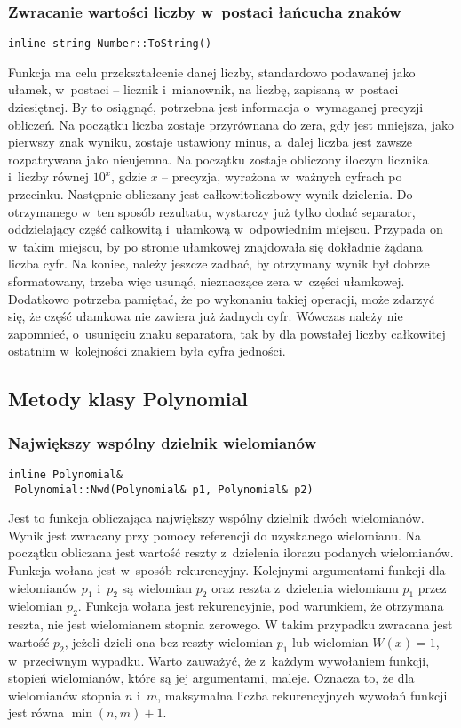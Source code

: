 \subsubsection{Zwracanie wartości liczby w~postaci łańcucha znaków}
\begin{lstlisting}
inline string Number::ToString()
\end{lstlisting}

Funkcja ma celu przekształcenie danej liczby, standardowo podawanej jako ułamek, w~postaci -- licznik i~mianownik, na liczbę, zapisaną w~postaci dziesiętnej. By to osiągnąć, potrzebna jest informacja o~wymaganej precyzji obliczeń. Na początku liczba zostaje przyrównana do zera, gdy jest mniejsza, jako pierwszy znak wyniku, zostaje ustawiony minus, a~dalej liczba jest zawsze rozpatrywana jako nieujemna. Na początku zostaje obliczony iloczyn licznika i~liczby równej $10^x$, gdzie $x$ -- precyzja, wyrażona w~ważnych cyfrach po przecinku. Następnie obliczany jest całkowitoliczbowy wynik dzielenia. Do otrzymanego w~ten sposób rezultatu, wystarczy już tylko dodać separator, oddzielający część całkowitą i~ułamkową w~odpowiednim miejscu. Przypada on w~takim miejscu, by po stronie ułamkowej znajdowała się dokładnie żądana liczba cyfr. Na koniec, należy jeszcze zadbać, by otrzymany wynik był dobrze sformatowany, trzeba więc usunąć, nieznaczące zera w~części ułamkowej. Dodatkowo potrzeba pamiętać, że po wykonaniu takiej operacji, może zdarzyć się, że część ułamkowa nie zawiera już żadnych cyfr. Wówczas należy nie zapomnieć, o~usunięciu znaku separatora, tak by dla powstałej liczby całkowitej ostatnim w~kolejności znakiem była cyfra jedności.

\subsection{Metody klasy Polynomial}

\subsubsection{Największy wspólny dzielnik wielomianów}
\begin{lstlisting}
inline Polynomial&
 Polynomial::Nwd(Polynomial& p1, Polynomial& p2)
\end{lstlisting}

Jest to funkcja obliczająca największy wspólny dzielnik dwóch wielomianów. Wynik jest zwracany przy pomocy referencji do uzyskanego wielomianu. Na początku obliczana jest wartość reszty z~dzielenia ilorazu podanych wielomianów. Funkcja wołana jest w~sposób rekurencyjny. Kolejnymi argumentami funkcji dla wielomianów $p_1$ i~$p_2$ są wielomian $p_2$ oraz reszta z~dzielenia wielomianu $p_1$ przez wielomian $p_2$. Funkcja wołana jest rekurencyjnie, pod warunkiem, że otrzymana reszta, nie jest wielomianem stopnia zerowego. W takim przypadku zwracana jest wartość $p_2$, jeżeli dzieli ona bez reszty wielomian $p_1$ lub wielomian $W(x)=1$, w~przeciwnym wypadku. Warto zauważyć, że z~każdym wywołaniem funkcji, stopień wielomianów, które są jej argumentami, maleje. Oznacza to, że dla wielomianów stopnia $n$ i~$m$, maksymalna liczba rekurencyjnych wywołań funkcji jest równa $\min(n,m)+1$.

